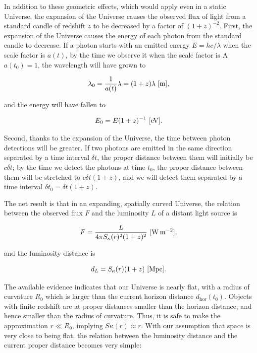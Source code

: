 \documentclass[a4paper,11pt]{article}
\begin{document}
{\noindent}In addition to these geometric effects, which would apply even in a static Universe, the expansion of the Universe causes the observed flux of light from a standard candle of redshift $z$ to be decreased by a factor of $(1+z)^{−2}$. First, the expansion of the Universe causes the energy of each photon from the standard candle to decrease. If a photon starts with an emitted energy $E = hc/λ$ when the scale factor is $a(t)$, by the time we observe it when the scale factor is A$a(t_0) = 1$, the wavelength will have grown to

\begin{align*}
    \lambda_0 = \frac{1}{a(t)}\lambda = (1+z)\lambda ~ [{\rm m}],
\end{align*}

{\noindent}and the energy will have fallen to

\begin{align*}
    E_0 = E(1+z)^{-1} ~ [{\rm eV}].
\end{align*}

{\noindent}Second, thanks to the expansion of the Universe, the time between photon detections will be greater. If two photons are emitted in the same direction separated by a time interval $\delta t$, the proper distance between them will initially be $c\delta t$; by the time we detect the photons at time $t_0$, the proper distance between them will be stretched to $c\delta t(1 + z)$, and we will detect them separated by a time interval $\delta t_0 = \delta t(1 + z)$.

{\noindent}The net result is that in an expanding, spatially curved Universe, the relation between the observed flux $F$ and the luminosity $L$ of a distant light source is

\begin{align*}
    F = \frac{L}{4\pi S_\kappa(r)^2(1+z)^2} ~ [{\rm W\,m^{-2}}],
\end{align*}

{\noindent}and the luminosity distance is

\begin{align*}
    d_L = S_\kappa(r)(1+z) ~ [{\rm Mpc}].
\end{align*}

{\noindent}The available evidence indicates that our Universe is nearly flat, with a radius of curvature $R_0$ which is larger than the current horizon distance $d_\mathrm{hor}(t_0)$. Objects with finite redshift are at proper distances smaller than the horizon distance, and hence smaller than the radius of curvature. Thus, it is safe to make the approximation $r \ll R_0$, implying $S\kappa(r) \approx r$. With our assumption that space is very close to being flat, the relation between the luminosity distance and the current proper distance becomes very simple:
\end{document}
